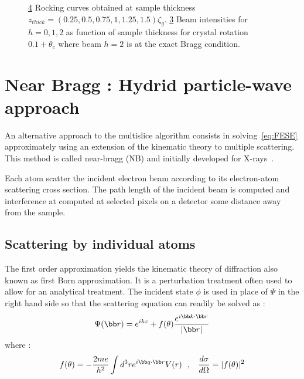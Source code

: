 \documentclass[a4paper,10pt]{article}
\begin{document}
\begin{figure}[h!]
	\begin{subfigure}{\textwidth}
		\centering
		\begin{subfigure}{0.45\textwidth}
			\centering
      \def\svgwidth{\columnwidth}
			
			\caption{}\label{fig:2_beam_rocking}
		\end{subfigure}
		\begin{subfigure}{0.45\textwidth}
			\centering
      \def\svgwidth{\columnwidth}
			
			\caption{}\label{fig:2_beam_Itheta_c}
		\end{subfigure}
  \end{subfigure}
	\caption[2-beam extinction]{
		\ref{fig:2_beam_rocking} Rocking curves obtained at sample thickness $z_{thick}=\left(0.25,0.5,0.75,1,1.25,1.5\right)\zeta_g$.
		\ref{fig:2_beam_Itheta_c} Beam intensities for $h=0,1,2$ as function of sample thickness for crystal rotation $0.1+\theta_c$ where beam $h=2$ is at the exact Bragg condition.
	}\label{fig:2_beam_rocking}
\end{figure}





\newpage
\section{Near Bragg : Hydrid particle-wave approach}
An alternative approach to the multislice algorithm consists in solving~\eqref{eq:FESE} approximately using an extension of the kinematic theory to multiple scattering. This method is called near-bragg (NB) and initially developed for X-rays~\cite{Holton}.

Each atom scatter the incident electron beam according to its electron-atom scattering cross section. The path length of the incident beam is computed and interference at computed at selected pixels on a detector some distance away from the sample.

\subsection{Scattering by individual atoms}
The first order approximation yields the kinematic theory of diffraction also known as first Born approximation. It is a perturbation treatment often used to allow for an analytical treatment. The incident state $\phi$ is used in place of $\Psi$ in the right hand side so that the scattering equation can readily be solved as :
\begin{equation}
    \Psi(\bb r)=e^{ikz} + f(\theta)\frac{e^{i\bb k\cdot\bb r}}{|\bb r|}
\end{equation}
where :
\begin{equation}
    f(\theta) = -\frac{2me}{h^2}\int d^3re^{i\bb q\cdot\bb r}V(r)
~~\mbox{,     }~~
    \frac{d\sigma}{d\Omega} = |f(\theta)|^2
\end{equation}
\end{document}
